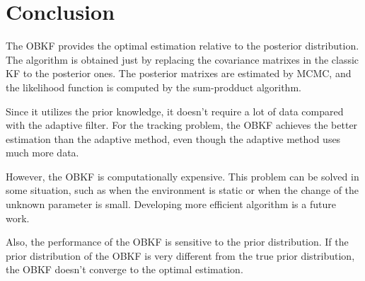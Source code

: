 \section{Conclusion}\label{sec:conclusion}

The OBKF provides the optimal estimation relative to the posterior distribution. The algorithm is obtained just by replacing the covariance matrixes in the classic KF to the posterior ones. The posterior matrixes are estimated by MCMC, and the likelihood function is computed by the sum-prodduct algorithm. 

Since it utilizes the prior knowledge, it doesn't require a lot of data compared with the adaptive filter. For the tracking problem, the OBKF achieves the better estimation than the adaptive method, even though the adaptive method uses much more data.

However, the OBKF is computationally expensive. This problem can be solved in some situation, such as when the environment is static or when the change of the unknown parameter is small. Developing more efficient algorithm is a future work.

Also, the performance of the OBKF is sensitive to the prior distribution. If the prior distribution of the OBKF is very different from the true prior distribution, the OBKF doesn't converge to the optimal estimation.
